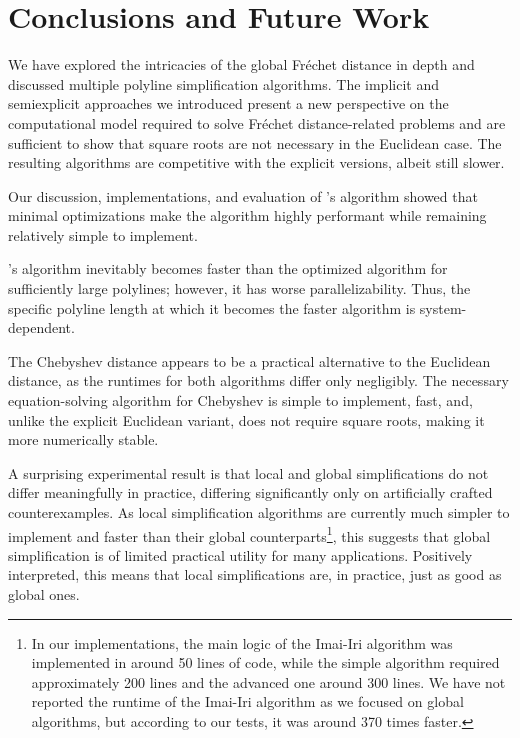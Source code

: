 \section{Conclusions and Future Work}
\label{sec:discussion_conclusion}

We have explored the intricacies of the global Fréchet distance in depth and discussed multiple polyline simplification algorithms.
The implicit and semiexplicit approaches we introduced present a new perspective on the computational model required to solve Fréchet distance-related problems and are sufficient to show that square roots are not necessary in the Euclidean case. The resulting algorithms are competitive with the explicit versions, albeit still slower.

Our discussion, implementations, and evaluation of \citeauthor{on_optimal_polyline_simplification_using_the_hausdorff_and_frechet_distance}'s algorithm showed that minimal optimizations make the algorithm highly performant while remaining relatively simple to implement.

\citeauthor{polyline_simplification_has_cubic_complexity_bringmannetal}'s algorithm inevitably becomes faster than the optimized \citeauthor{on_optimal_polyline_simplification_using_the_hausdorff_and_frechet_distance} algorithm for sufficiently large polylines; however, it has worse parallelizability. Thus, the specific polyline length at which it becomes the faster algorithm is system-dependent.

The Chebyshev distance appears to be a practical alternative to the Euclidean distance, as the runtimes for both algorithms differ only negligibly. The necessary equation-solving algorithm for Chebyshev is simple to implement, fast, and, unlike the explicit Euclidean variant, does not require square roots, making it more numerically stable.

A surprising experimental result is that local and global simplifications do not differ meaningfully in practice, differing significantly only on artificially crafted counterexamples. As local simplification algorithms are currently much simpler to implement and faster than their global counterparts\footnote{In our implementations, the main logic of the Imai-Iri algorithm was implemented in around 50 lines of code, while the simple algorithm required approximately 200 lines and the advanced one around 300 lines. We have not reported the runtime of the Imai-Iri algorithm as we focused on global algorithms, but according to our tests, it was around 370 times faster.}, this suggests that global simplification is of limited practical utility for many applications. Positively interpreted, this means that local simplifications are, in practice, just as good as global ones.

